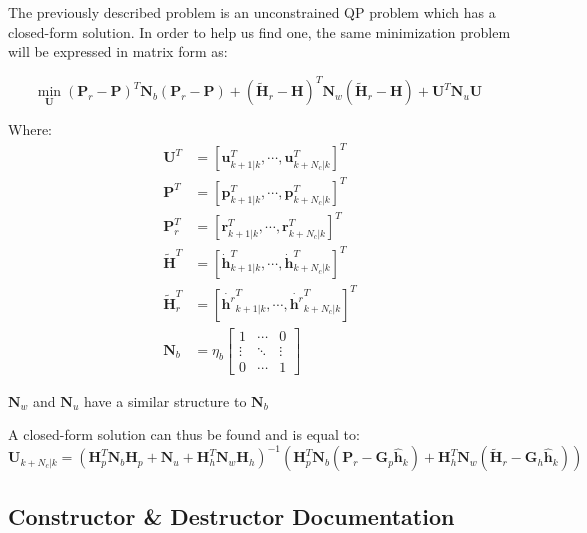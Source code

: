 The previously described problem is an unconstrained QP problem which has a closed-\/form solution. In order to help us find one, the same minimization problem will be expressed in matrix form as\+:

\[ \underset{\mathbf{U}}{\text{min}} \; (\mathbf{P}_r - \mathbf{P})^T \mathbf{N}_b (\mathbf{P}_r - \mathbf{P}) + (\tilde{\mathbf{H}}_r - \mathbf{H})^T\mathbf{N}_w(\tilde{\mathbf{H}}_r - \mathbf{H}) + \mathbf{U}^T\mathbf{N}_u \mathbf{U} \]

Where\+: \begin{align*} \mathbf{U}^T &= \left[ \mathbf{u}^T_{k+1|k}, \cdots, \mathbf{u}^T_{k+N_c|k} \right]^T \\ \mathbf{P}^T &= \left[ \mathbf{p}^T_{k+1|k}, \cdots, \mathbf{p}^T_{k+N_c|k} \right]^T \\ \mathbf{P}^T_r &= \left[ \mathbf{r}^T_{k+1|k}, \cdots, \mathbf{r}^T_{k+N_c|k} \right]^T \\ \mathbf{\tilde{H}}^T &= \left[ \dot{\mathbf{h}}^T_{k+1|k}, \cdots, \dot{\mathbf{h}}^T_{k+N_c|k} \right]^T \\ \mathbf{\tilde{H}}^T_r &= \left[ \dot{\mathbf{h}^r}^T_{k+1|k}, \cdots, \dot{\mathbf{h}^r}^T_{k+N_c|k} \right]^T \\ \mathbf{N}_b &= \eta_b\left[\begin{array}{ccc} 1 & \cdots & 0 \\ \vdots & \ddots & \vdots\\ 0 & \cdots & 1 \end{array}\right] \end{align*}

$\mathbf{N}_w$ and $\mathbf{N}_u$ have a similar structure to $\mathbf{N}_b$

A closed-\/form solution can thus be found and is equal to\+: \[ \mathbf{U}_{k+N_c|k} = (\mathbf{H}_p^T \mathbf{N}_b \mathbf{H}_p + \mathbf{N}_u + \mathbf{H}_h^T \mathbf{N}_w \mathbf{H}_h)^{-1} \left(\mathbf{H}^T_p \mathbf{N}_b (\mathbf{P}_r - \mathbf{G}_p \hat{\mathbf{h}}_k) + \mathbf{H}^T_h\mathbf{N}_w(\tilde{\mathbf{H}}_r - \mathbf{G}_h \hat{\mathbf{h}}_k)\right) \] 

\subsection{Constructor \& Destructor Documentation}
\hypertarget{classZmpPreviewController_af1c464b13886dc0edf2f295fc215b13c}{}\label{classZmpPreviewController_af1c464b13886dc0edf2f295fc215b13c} 
